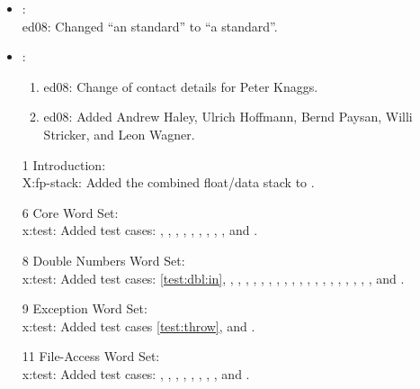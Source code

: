 	\begin{itemize}
	\item {}: \\
		\textsf{ed08}: Changed ``an standard'' to ``a standard''.

	\item {}:
		\begin{enumerate}
		\item \textsf{ed08}: Change of contact details for Peter Knaggs.
		\item \textsf{ed08}: Added Andrew Haley, Ulrich Hoffmann,
			Bernd Paysan, Willi Stricker, and Leon Wagner.
		\end{enumerate}

	\item[1] Introduction: \\
		\textsf{X:fp-stack}: Added the combined float/data
			stack to .

	\item[6] Core Word Set: \\
		\textsf{x:test}: Added test cases:
			,
			,
			,
			,
			,
			,
			,
			,
			,
			 and
			.

	\item[8] Double Numbers Word Set: \\
		\textsf{x:test}: Added test cases:
		\ref{test:dbl:in},
		, 
		,
		,
		,
		,
		,
		,
		,
		,
		,
		,
		,
		,
		,
		,
		,
		,
		,
		,
		 and
		.

	\item[9] Exception Word Set: \\
		\textsf{x:test}: Added test cases
		\ref{test:throw},
		 and
		.

	\item[11] File-Access Word Set: \\
		\textsf{x:test}: Added test cases:
		,
		,
		,
		,
		,
		,
		,
		,
		 and
		.


\end{itemize}

